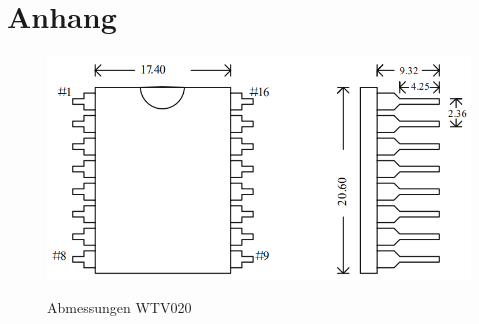 \chapter{Anhang}
\thispagestyle{fancy}  
\begin{figure}[h]
\centering
\includegraphics[scale=0.5]{Bilder/footprint_wtv020.png}
\label{fig:irgendesBild}
\caption[Abmessungen WTV020]{Abmessungen WTV020}
\end{figure}